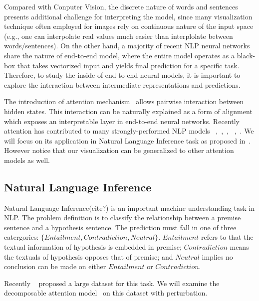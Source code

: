 Compared with Conputer Vision, the discrete nature of words and sentences
presents additional challenge for
interpreting the model, since many visualization technique often employed
for images rely on continuous nature of the input space (e.g., one can interpolate
real values much easier than interplolate between words/sentences).
%
On the other hand, a majority of recent NLP neural networks share the nature of
end-to-end model, where the entire model operates as a black-box that takes
vectorized input and yields final prediction for a specific task.
Therefore, to study the inside of end-to-end neural models, it is important to
explore the interaction between intermediate representations and predictions.

The introduction of attention mechanism~\cite{bahdanau2014neural} allows
pairwise interaction between hidden states. This interaction can be naturally explained
as a form of alignment which exposes an interpretable layer in end-to-end neural networks.
Recently attention has contributed to many strongly-performed NLP models
~\cite{parikh2016emnlp},~\cite{rush2015neural},~\cite{yang2016hierarchical},
~\cite{seo2016bidirectional},~\cite{schwartz2017high}.
We will focus on its application in Natural Language Inference task as proposed in~\cite{parikh2016emnlp}.
However notice that our visualization can be generalized to other attention models as well.

\subsection{Natural Language Inference}
Natural Language Inference(cite?) is an important machine understanding task in NLP.
The problem definition is to classify the relationship between a premise sentence and a hypothesis sentence.
The prediction must fall in one of three catergories: $\{Entailment, Contradiction, Neutral\}$.
$Entailment$ refers to that the textual information of hypothesis is embedded in premise;
$Contradiction$ means the textuals of hypothesis opposes that of premise;
and $Neutral$ implies no conclusion can be made on either $Entailment$ or $Contradiction$.

Recently ~\cite{BowmanAngeliPotts2015} proposed a large dataset for this task. We will examine
the decomposable attention model~\cite{parikh2016emnlp} on this dataset with perturbation.



